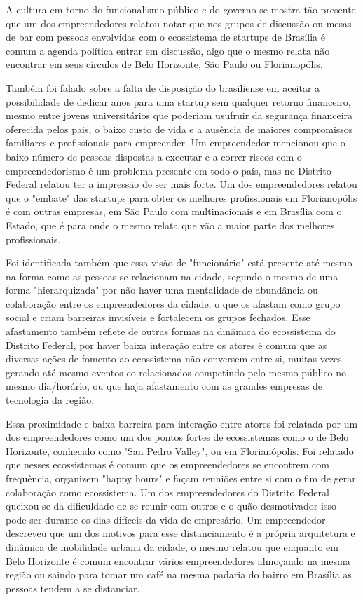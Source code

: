 A cultura em torno do funcionalismo público e do governo se mostra tão presente que um dos empreendedores relatou notar que nos grupos de discussão ou mesas de bar com pessoas envolvidas com o ecossistema de startups de Brasília é comum a agenda política entrar em discussão, algo que o mesmo relata não encontrar em seus círculos de Belo Horizonte, São Paulo ou Florianopólis.

Também foi falado sobre a falta de disposição do brasiliense em aceitar a possibilidade de dedicar anos para uma startup sem qualquer retorno financeiro, mesmo entre jovens universitários que poderiam usufruir da segurança financeira oferecida pelos pais, o baixo custo de vida e a ausência de maiores compromissos familiares e profissionais para empreender. Um empreendedor mencionou que o baixo número de pessoas dispostas a executar e a correr riscos com o empreendedorismo é um problema presente em todo o país, mas no Distrito Federal relatou ter a impressão de ser mais forte. Um dos empreendedores relatou que o "embate" das startups para obter os melhores profissionais em Florianopólis é com outras empresas, em São Paulo com multinacionais e em Brasília com o Estado, que é para onde o mesmo relata que vão a maior parte dos melhores profissionais.

Foi identificada também que essa visão de "funcionário" está presente até mesmo na forma como as pessoas se relacionam na cidade, segundo o mesmo de uma forma "hierarquizada" por não haver uma mentalidade de abundância ou colaboração entre os empreendedores da cidade, o que os afastam como grupo social e criam barreiras invisíveis e fortalecem os grupos fechados. Esse afastamento também reflete de outras formas na dinâmica do ecossistema do Distrito Federal, por haver baixa interação entre os atores é comum que as diversas ações de fomento ao ecossistema não conversem entre si, muitas vezes gerando até mesmo eventos co-relacionados competindo pelo mesmo público no mesmo dia/horário, ou que haja afastamento com as grandes empresas de tecnologia da região.

Essa proximidade e baixa barreira para interação entre atores foi relatada por um dos empreendedores como um dos pontos fortes de ecossistemas como o de Belo Horizonte, conhecido como "San Pedro Valley", ou em Florianópolis. Foi relatado que nesses ecossistemas é comum que os empreendedores se encontrem com frequência, organizem "happy hours" e façam reuniões entre si com o fim de gerar colaboração como ecossistema. Um dos empreendedores do Distrito Federal queixou-se da dificuldade de se reunir com outros e o quão desmotivador isso pode ser durante os dias difíceis da vida de empresário. Um empreendedor descreveu que um dos motivos para esse distanciamento é a própria arquitetura e dinâmica de mobilidade urbana da cidade, o mesmo relatou que enquanto em Belo Horizonte é comum encontrar vários empreendedores almoçando na mesma região ou saindo para tomar um café na mesma padaria do bairro em Brasília as pessoas tendem a se distanciar.

